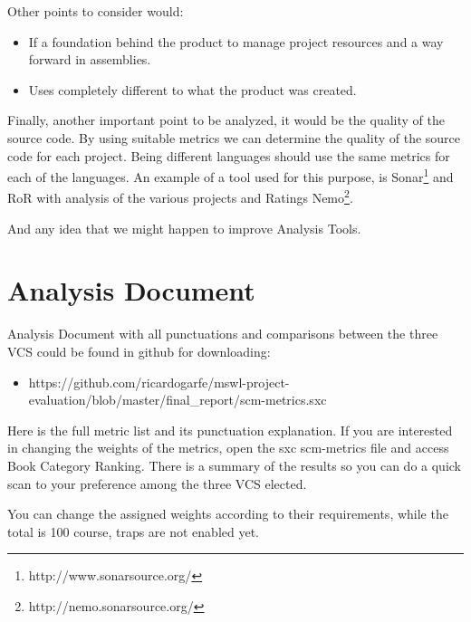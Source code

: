 \documentclass[11pt]{scrartcl}
\begin{document}
\par Other points to consider would:

\begin{itemize}
\item If a foundation behind the product to manage project resources and a way forward in assemblies.

\item Uses completely different to what the product was created.

\end{itemize}

\par Finally, another important point to be analyzed, it would be the quality of the source code. By using suitable metrics we can determine the quality of the source code for each project. Being different languages ​​should use the same metrics for each of the languages. An example of a tool used for this purpose, is Sonar\footnote{http://www.sonarsource.org/} and RoR with analysis of the various projects and Ratings Nemo\footnote{http://nemo.sonarsource.org/}.

\par And any idea that we might happen to improve Analysis Tools.

\section{Analysis Document}

Analysis Document with all punctuations and comparisons between the three VCS could be found in github for downloading:
\begin{itemize}
    \item https://github.com/ricardogarfe/mswl-project-evaluation/blob/master/final\_report/scm-metrics.sxc
\end{itemize}

\par Here is the full metric list and its punctuation explanation. If you are interested in changing the weights of the metrics, open the sxc scm-metrics file and access Book Category Ranking. There is a summary of the results so you can do a quick scan to your preference among the three VCS elected.

\par You can change the assigned weights according to their requirements, while the total is 100 course, traps are not enabled yet.
\end{document}
